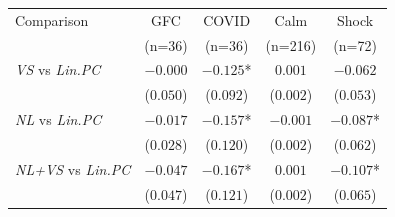 \begin{tabular}{lcccc}
\toprule
Comparison & GFC & COVID & Calm & Shock \\
 & (n=36) & (n=36) & (n=216) & (n=72) \\
\midrule
\emph{VS} vs \emph{Lin.PC} & $-0.000$ & $-0.125$* & $0.001$ & $-0.062$ \\
 & \footnotesize($0.050$) & \footnotesize($0.092$) & \footnotesize($0.002$) & \footnotesize($0.053$) \\[4pt]
\emph{NL} vs \emph{Lin.PC} & $-0.017$ & $-0.157$* & $-0.001$ & $-0.087$* \\
 & \footnotesize($0.028$) & \footnotesize($0.120$) & \footnotesize($0.002$) & \footnotesize($0.062$) \\[4pt]
\emph{NL+VS} vs \emph{Lin.PC} & $-0.047$ & $-0.167$* & $0.001$ & $-0.107$* \\
 & \footnotesize($0.047$) & \footnotesize($0.121$) & \footnotesize($0.002$) & \footnotesize($0.065$) \\[4pt]
\bottomrule
\end{tabular}
